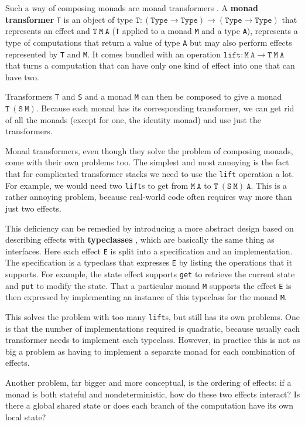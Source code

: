 \documentclass[declaration,inz,english,shortabstract]{iithesis}
\newcommand{\m}[1]{\texttt{#1}}
\newcommand{\Type}{\texttt{Type}}
\begin{document}
Such a way of composing monads are monad transformers \cite{mtl}. A \textbf{monad transformer} \m{T} is an object of type $\m{T} : (\Type \to \Type) \to (\Type \to \Type)$ that represents an effect and $\m{T}\ \m{M}\ \m{A}$ (\m{T} applied to a monad \m{M} and a type \m{A}), represents a type of computations that return a value of type \m{A} but may also perform effects represented by \m{T} and \m{M}. It comes bundled with an operation $\m{lift} : \m{M}\ \m{A} \to \m{T}\ \m{M}\ \m{A}$ that turns a computation that can have only one kind of effect into one that can have two.

Transformers \m{T} and \m{S} and a monad \m{M} can then be composed to give a monad $\m{T}\ (\m{S}\ \m{M})$. Because each monad has its corresponding transformer, we can get rid of all the monads (except for one, the identity monad) and use just the transformers.

Monad transformers, even though they solve the problem of composing monads, come with their own problems too. The simplest and most annoying
is the fact that for complicated transformer stacks we need to use the \m{lift} operation a lot. For example, we would need two \m{lift}s to get from $\m{M}\ \m{A}$ to $\m{T}\ (\m{S}\ \m{M})\ \m{A}$. This is a rather annoying problem, because real-world code often requires way more than just two effects.

This deficiency can be remedied by introducing a more abstract design based on describing effects with \textbf{typeclasses} \cite{mtl}, which are basically the same thing as interfaces. Here each effect \m{E} is split into a specification and an implementation. The specification is a typeclass that expresses \m{E} by listing the operations that it supports. For example, the state effect supports \m{get} to retrieve the current state and \m{put} to modify the state. That a particular monad \m{M} supports the effect \m{E} is then expressed by implementing an instance of this typeclass for the monad \m{M}.

This solves the problem with too many \m{lift}s, but still has its own problems. One is that the number of implementations required is quadratic, because usually each transformer needs to implement each typeclass. However, in practice this is not as big a problem as having to implement a separate monad for each combination of effects.

Another problem, far bigger and more conceptual, is the ordering of effects: if a monad is both stateful and nondeterministic, how do these two effects interact? Is there a global shared state or does each branch of the computation have its own local state?
\end{document}
